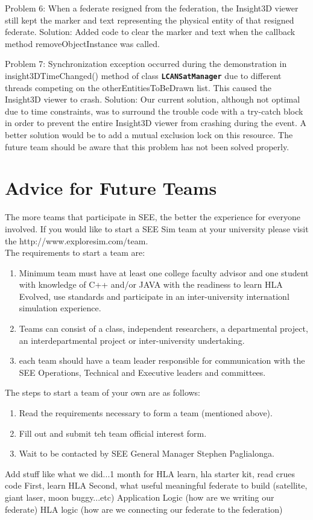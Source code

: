 \documentclass[journal, onecolumn]{IEEEtran}
\newcommand\uml[1]{\texttt{\textbf{#1}}}
\begin{document}
Problem 6: When a federate resigned from the federation, the Insight3D viewer still kept the marker and text representing the physical entity of that resigned federate.
Solution: Added code to clear the marker and text when the callback method removeObjectInstance was called.

Problem 7: Synchronization exception occurred during the demonstration in insight3DTimeChanged() method of class \uml{LCANSatManager} due to different threads competing on the otherEntitiesToBeDrawn list. This caused the Insight3D viewer to crash.
Solution: Our current solution, although not optimal due to time constraints, was to surround the trouble code with a try-catch block in order to prevent the entire Insight3D viewer from crashing during the event. A better solution would be to add a mutual exclusion lock on this resource. The future team should be aware that this problem has not been solved properly.

\section{Advice for Future Teams}
The more teams that participate in SEE, the better the experience for everyone involved.  If you would like to start a SEE Sim team at your university please visit the http://www.exploresim.com/team.\\
The requirements to start a team are:
\begin{enumerate}
	\item Minimum team must have at least one college faculty advisor and one student with knowledge of C++ and/or JAVA with the readiness to learn HLA 	 		Evolved, use standards and participate in an inter-university internationl simulation experience.  
	\item Teams can consist of a class, independent researchers, a departmental project, an interdepartmental project or inter-university undertaking.
	\item each team should have a team leader responsible for communication with the SEE Operations, Technical and Executive leaders and committees.
\end{enumerate}

The steps to start a team of your own are as follows:
\begin{enumerate}
	\item Read the requirements necessary to form a team (mentioned above).
	\item Fill out and submit teh team official interest form.
	\item Wait to be contacted by SEE General Manager Stephen Paglialonga.
\end{enumerate}
Add stuff like what we did...1 month for HLA learn, hla starter kit, read crues code
First, learn HLA
Second, what useful meaningful federate to build (satellite, giant laser, moon buggy...etc)
Application Logic (how are we writing our federate)
HLA logic (how are we connecting our federate to the federation)
\end{document}
